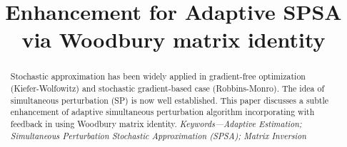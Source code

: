 \documentclass[conference]{IEEEtran}
\begin{document}
\title{Enhancement for Adaptive SPSA\\ via Woodbury matrix identity}


\author{
\and
{}
\and
{}
}




\maketitle

\begin{abstract}
Stochastic approximation has been widely applied in gradient-free optimization (Kiefer-Wolfowitz) and stochastic gradient-based case (Robbins-Monro). The idea of simultaneous perturbation (SP) is now well established. This paper discusses a subtle enhancement of adaptive simultaneous perturbation algorithm incorporating with feedback in using Woodbury matrix identity.
\textit{Keywords---Adaptive Estimation; Simultaneous Perturbation Stochastic Approximation (SPSA); Matrix Inversion}
\end{abstract}





%
\IEEEpeerreviewmaketitle
\end{document}
